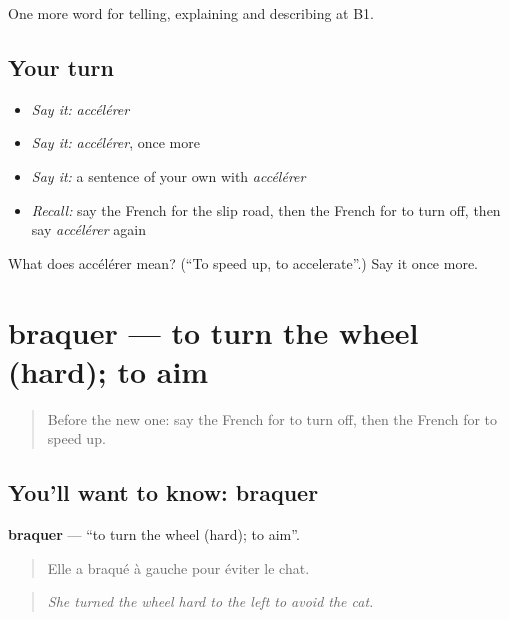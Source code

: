 \begin{grammarlens}[title={What you've built}]
One more word for telling, explaining and describing at B1.
\end{grammarlens}

\subsection*{Your turn}
\begin{itemize}
\raggedright
  \item \emph{Say it:} \emph{accélérer}
  \item \emph{Say it:} \emph{accélérer}, once more
  \item \emph{Say it:} a sentence of your own with \emph{accélérer}
  \item \emph{Recall:} say the French for the slip road, then the French for to turn off, then say \emph{accélérer} again
\end{itemize}

\begin{tcolorbox}[breakable,colback=teal!4,colframe=teal!35!black,title={Before you move on}]
What does accélérer mean? (\textquotedblleft{}To speed up, to accelerate\textquotedblright{}.) Say it once more.
\end{tcolorbox}
\section[braquer]{braquer — to turn the wheel (hard); to aim}

\label{lesson:FR-C401-braquer}



\begin{quote}
Before the new one: say the French for to turn off, then the French for to speed up.
\end{quote}

\subsection*{You'll want to know: braquer}
\textbf{braquer} — \textquotedblleft{}to turn the wheel (hard); to aim\textquotedblright{}.

\begin{quote}
Elle a braqué à gauche pour éviter le chat.
\end{quote}

\begin{quote}
\emph{She turned the wheel hard to the left to avoid the cat.}
\end{quote}

